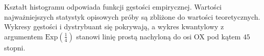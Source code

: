 \documentclass[12pt]{mwart}
\begin{document}
	\begin{figure} [H]
		\centering 
	\end{figure}
	
	\begin{figure} [H]
		\centering 
	\end{figure}
	
	\noindent Kształt histogramu odpowiada funkcji gęstości empirycznej. Wartości najważniejszych statystyk opisowych próby są zbliżone do wartości teoretycznych.
 Wykresy gęstości i dystrybuant się pokrywają, a wykres kwantylowy z argumentem $\mathrm{Exp} \left( \frac{1}{4} \right) $ stanowi linię prostą nachyloną do osi OX pod kątem $45$ stopni.
	
\end{document}
